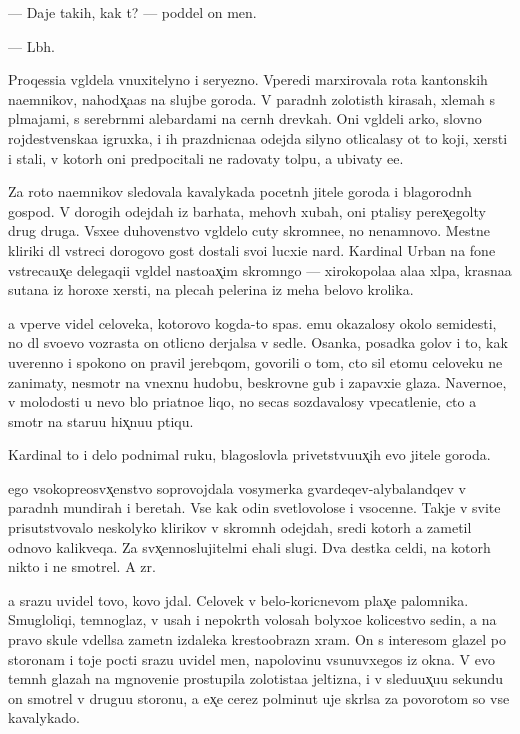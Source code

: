 \documentclass[10pt]{book}
\begin{document}
— Daje takih, kak t{\yi}? — poddel on men{\ia}.

— L{\iu}b{\yi}h.

Proqessi{\y}a v{\yi}gl{\ia}dela vnuxitelyno i seryezno. Vperedi marxirovala rota kantonskih na{\y}emnikov, nahod{\ia}x̨a{\y}as{\ia} na slujbe goroda. V paradn{\yi}h zolotist{\yi}h kirasah, xlemah s pl{\iu}majami, s serebr{\ia}n{\yi}mi alebardami na cern{\yi}h drevkah. Oni v{\yi}gl{\ia}deli {\y}arko, slovno rojdestvenska{\y}a igruxka, i ih prazdnicna{\y}a odejda silyno otlicalasy ot to{\y} koji, xersti i stali, v kotor{\yi}h oni predpocitali ne radovaty tolpu, a ubivaty {\y}e{\y}e.

Za roto{\y} na{\y}emnikov sledovala kavalykada pocetn{\yi}h jitele{\y} goroda i blagorodn{\yi}h gospod. V dorogih odejdah iz barhata, mehov{\yi}h xubah, oni p{\yi}talisy perex̨egol{\ia}ty drug druga. V{\yi}sxe{\y}e duhovenstvo v{\yi}gl{\ia}delo cuty skromne{\y}e, no nenamnovo. Mestn{\yi}{\y}e kliriki dl{\ia} vstreci dorogovo gost{\ia} dostali svo{\y}i lucxi{\y}e nar{\ia}d{\yi}. Kardinal Urban na fone vstreca{\y}ux̨e{\y} delegaqi{\y}i v{\yi}gl{\ia}del nasto{\y}ax̨im skromn{\ia}go{\y} — xirokopola{\y}a ala{\y}a xl{\ia}pa, krasna{\y}a sutana iz horoxe{\y} xersti, na plecah pelerina iz meha belovo krolika.

{\Y}a vperv{\yi}{\y}e videl celoveka, kotorovo kogda-to spas. {\Y}emu okazalosy okolo semides{\ia}ti, no dl{\ia} svo{\y}evo vozrasta on otlicno derjalsa v sedle. Osanka, posadka golov{\yi} i to, kak uverenno i spoko{\y}no on pravil jerebqom, govorili o tom, cto sil etomu celoveku ne zanimaty, nesmotr{\ia} na vnexn{\iu}{\y}u hudobu, beskrovn{\yi}{\y}e gub{\yi} i zapavxi{\y}e glaza. Naverno{\y}e, v molodosti u nevo b{\yi}lo pri{\y}atno{\y}e liqo, no se{\y}cas sozdavalosy vpecatleni{\y}e, cto {\y}a smotr{\iu} na staru{\y}u hix̨nu{\y}u ptiqu.

Kardinal to i delo podnimal ruku, blagoslovl{\ia}{\y}a privetstvu{\y}ux̨ih {\y}evo jitele{\y} goroda.

{\Y}ego v{\yi}sokopreosv{\ia}x̨enstvo soprovojdala vosymerka gvarde{\y}qev-alybalandqev v paradn{\yi}h mundirah i beretah. Vse kak odin svetlovolos{\yi}{\y}e i v{\yi}socenn{\yi}{\y}e. Takje v svite prisutstvovalo neskolyko klirikov v skromn{\yi}h odejdah, sredi kotor{\yi}h {\y}a zametil odnovo kalikveqa. Za sv{\ia}x̨ennoslujitel{\ia}mi {\y}ehali slugi. Dva des{\ia}tka cel{\ia}di, na kotor{\yi}h nikto i ne smotrel. A zr{\ia}.

{\Y}a srazu uvidel tovo, kovo jdal. Celovek v belo-koricnevom plax̨e palomnika. Smugloliqi{\y}, temnoglaz{\yi}{\y}, v usah i nepokr{\yi}t{\yi}h volosah bolyxo{\y}e kolicestvo sedin{\yi}, a na pravo{\y} skule v{\yi}del{\ia}lsa zametn{\yi}{\y} izdaleka krestoobrazn{\yi}{\y} xram. On s interesom glazel po storonam i toje pocti srazu uvidel men{\ia}, napolovinu v{\yi}sunuvxegos{\ia} iz okna. V {\y}evo temn{\yi}h glazah na mgnoveni{\y}e prostupila zolotista{\y}a jeltizna, i v sledu{\y}ux̨u{\y}u sekundu on smotrel v drugu{\y}u storonu, a {\y}ex̨e cerez polminut{\yi} uje skr{\yi}lsa za povorotom so vse{\y} kavalykado{\y}.
\end{document}

